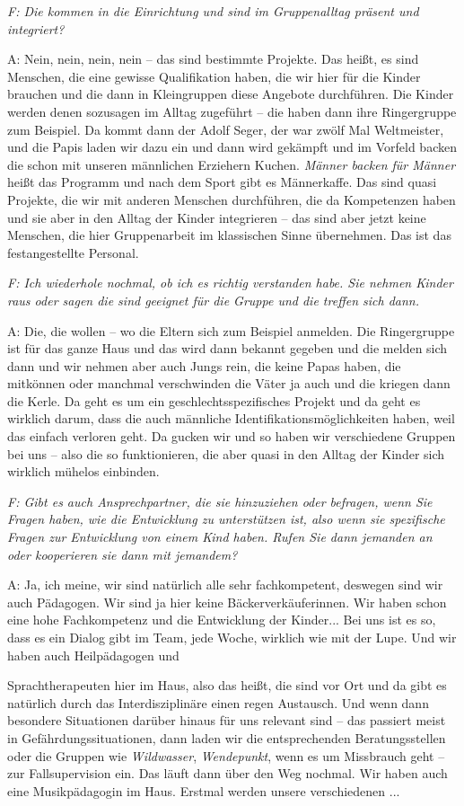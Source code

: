 \begin{linenumbers}
\emph{F: Die kommen in die Einrichtung und sind im Gruppenalltag präsent und integriert?} 

A: Nein, nein, nein, nein -- das sind bestimmte Projekte.
Das heißt, es sind Menschen, die eine gewisse Qualifikation haben, die wir hier für die Kinder brauchen und die dann in Kleingruppen diese Angebote durchführen. Die Kinder werden denen sozusagen im Alltag  zugeführt -- die haben dann ihre Ringergruppe zum Beispiel. Da kommt dann der Adolf Seger, der war zwölf Mal Weltmeister, und die Papis laden wir dazu ein und dann wird gekämpft und im Vorfeld backen die schon mit unseren männlichen Erziehern Kuchen. \emph{Männer backen für Männer} heißt das Programm und nach dem Sport gibt es Männerkaffe. Das sind quasi Projekte, die wir mit anderen Menschen durchführen, die da Kompetenzen haben und sie aber in den Alltag der Kinder integrieren -- das sind aber jetzt keine Menschen, die hier Gruppenarbeit im klassischen Sinne übernehmen. Das ist das festangestellte Personal. 

\emph{F: Ich wiederhole nochmal, ob ich es richtig verstanden habe. Sie nehmen Kinder raus oder sagen die sind geeignet für die Gruppe und die treffen sich dann.}

A: Die, die wollen -- wo die Eltern sich zum Beispiel anmelden. Die Ringergruppe ist für das ganze Haus und das wird dann bekannt gegeben und die melden sich dann und wir nehmen aber auch Jungs rein, die keine Papas haben, die mitkönnen oder manchmal verschwinden die Väter ja auch und die kriegen dann die Kerle. Da geht es um ein geschlechtsspezifisches Projekt und da geht es wirklich darum, dass die auch männliche Identifikationsmöglichkeiten haben, weil das einfach verloren geht. Da gucken wir und so haben wir verschiedene Gruppen bei uns -- also die so funktionieren, die aber quasi in den Alltag der Kinder sich wirklich mühelos einbinden.


\emph{F: Gibt es auch Ansprechpartner, die sie hinzuziehen oder befragen, wenn Sie Fragen haben, wie die Entwicklung zu unterstützen ist, also wenn sie spezifische Fragen zur Entwicklung von einem Kind haben. Rufen Sie dann jemanden an oder kooperieren sie dann mit jemandem?}

A: Ja, ich meine, wir sind natürlich alle sehr fachkompetent, deswegen sind wir auch Pädagogen. Wir sind ja hier keine Bäckerverkäuferinnen. Wir haben schon eine hohe Fachkompetenz und die Entwicklung der Kinder... Bei uns ist es so, dass es ein Dialog gibt im Team, jede Woche, wirklich wie mit der Lupe. Und wir haben auch Heilpädagogen und {\linenumbers\par}
Sprachtherapeuten hier im Haus, also das heißt, die sind vor Ort und da gibt es natürlich durch das Interdisziplinäre einen regen Austausch. Und wenn dann besondere Situationen darüber hinaus für uns relevant sind -- das passiert meist in Gefährdungssituationen, dann laden wir die entsprechenden Beratungsstellen oder die Gruppen wie \emph{Wildwasser}, \emph{Wendepunkt}, wenn es um Missbrauch geht -- zur Fallsupervision ein. Das läuft dann über den Weg nochmal. Wir haben auch eine Musikpädagogin im Haus. Erstmal werden unsere verschiedenen ...


\end{linenumbers}
